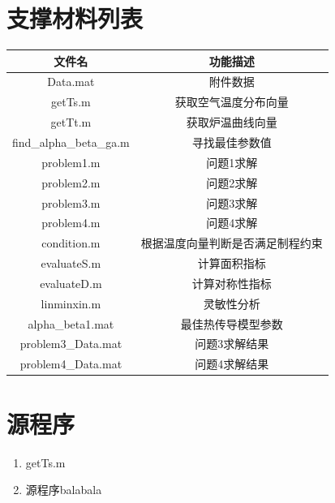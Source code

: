 \documentclass[12pt,utf8]{article}
\begin{document}
\section{支撑材料列表}
\begin{table}[htbp]
	\centering
	\begin{tabular}{cc}
		\toprule[1.5pt]
		文件名   & 功能描述 \\
		\midrule
		Data.mat & 附件数据 \\
		getTs.m & 获取空气温度分布向量 \\
		getTt.m & 获取炉温曲线向量 \\
		find\_alpha\_beta\_ga.m & 寻找最佳参数值 \\
		problem1.m & 问题1求解 \\
		problem2.m & 问题2求解 \\
		problem3.m & 问题3求解 \\
		problem4.m & 问题4求解 \\
		condition.m & 根据温度向量判断是否满足制程约束 \\
		evaluateS.m & 计算面积指标 \\
		evaluateD.m & 计算对称性指标 \\
		linminxin.m & 灵敏性分析 \\
		alpha\_beta1.mat & 最佳热传导模型参数 \\
		problem3\_Data.mat & 问题3求解结果 \\
		problem4\_Data.mat & 问题4求解结果 \\
		\bottomrule[1.5pt]
	\end{tabular}%
	\label{tab:addlabel}%
\end{table}%

\section{源程序}
 
\begin{enumerate}
\item getTs.m

\item 源程序balabala
\end{enumerate}
\end{document}

